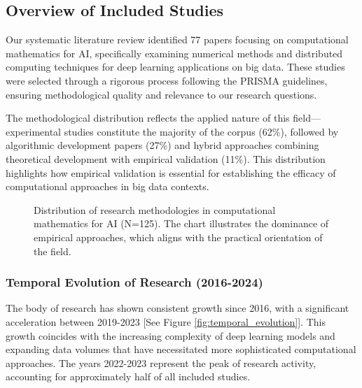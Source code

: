 

\subsection{Overview of Included Studies}
Our systematic literature review identified 77 papers focusing on computational mathematics for AI, specifically examining numerical methods and distributed computing techniques for deep learning applications on big data. These studies were selected through a rigorous process following the PRISMA guidelines, ensuring methodological quality and relevance to our research questions.

The methodological distribution reflects the applied nature of this field—experimental studies constitute the majority of the corpus (62\%), followed by algorithmic development papers (27\%) and hybrid approaches combining theoretical development with empirical validation (11\%). This distribution highlights how empirical validation is essential for establishing the efficacy of computational approaches in big data contexts.

\begin{figure}[h]
\centering
{}
\caption{Distribution of research methodologies in computational mathematics for AI (N=125). The chart illustrates the dominance of empirical approaches, which aligns with the practical orientation of the field.}
\label{fig:methodology_distribution}
\end{figure}

\subsubsection{Temporal Evolution of Research (2016-2024)}
The body of research has shown consistent growth since 2016, with a significant acceleration between 2019-2023 [See Figure \ref{fig:temporal_evolution}]. This growth coincides with the increasing complexity of deep learning models and expanding data volumes that have necessitated more sophisticated computational approaches. The years 2022-2023 represent the peak of research activity, accounting for approximately half of all included studies.

